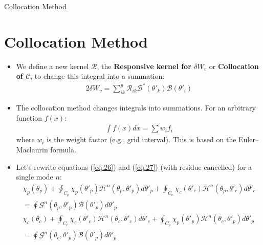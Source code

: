 \documentclass[8pt]{beamer}
\begin{document}
\begin{frame}{\color{white} Collocation Method}
\section{Collocation Method}
\begin{itemize}
    \item We define a new kernel $\mathcal{R}$, the \textbf{Responsive kernel for $\delta W_v$} or \textbf{Collocation of $\mathcal{C}$}, to change this integral into a summation:
    \begin{align}
         2 \delta W_v = \sum_{ik}^p \mathcal{R}_{ik} \mathcal{B}^*(\theta'_k) \mathcal{B}(\theta'_i) \label{eq:deltaW_R}
    \end{align}
    \item The collocation method changes integrals into summations. For an arbitrary function $f(x)$:
    \begin{align}
         \int f(x)dx = \sum w_i f_i
    \end{align}
    where $w_i$ is the weight factor (e.g., grid interval). This is based on the Euler–Maclaurin formula.
    \item Let's rewrite equations (\ref{eq:26}) and (\ref{eq:27}) (with residue cancelled) for a single mode $n$:
    \begin{align}
         \chi_p(\theta_p) + \oint_{C_p} \chi_p(\theta'_p) \mathcal{H}^n(\theta_p, \theta'_p) d\theta'_p  
         +  \oint_{C_c} \chi_c(\theta'_c) \mathcal{H}^n(\theta_p, \theta'_c) d\theta'_c  \nonumber\\
         = \oint \mathcal{G}^n(\theta_p, \theta'_p) \mathcal{B}(\theta'_p) d\theta'_p \label{eq:26-rewritten}\\ 
         \chi_c(\theta_c) + \oint_{C_c} \chi_c(\theta'_c) \mathcal{H}^n(\theta_c, \theta'_c) d\theta'_c  
         + \oint_{C_p} \chi_p(\theta'_p) \mathcal{H}^n(\theta_c, \theta'_p) d\theta'_p \nonumber\\
         = \oint \mathcal{G}^n(\theta_c, \theta'_p) \mathcal{B}(\theta'_p) d\theta'_p \label{eq:27-rewritten}
    \end{align}

\end{itemize}
\end{frame}
\end{document}
